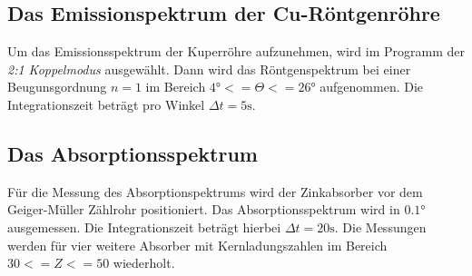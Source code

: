 \subsection{Das Emissionspektrum der Cu-Röntgenröhre}
Um das Emissionsspektrum der Kuperröhre aufzunehmen, wird im Programm der \textit{2:1 Koppelmodus}
ausgewählt. Dann wird das Röntgenspektrum bei einer Beugunsgordnung $n=1$ im Bereich
$4 \si{\degree} <= \Theta <= 26 \si{\degree}$ aufgenommen. Die Integrationszeit
beträgt pro Winkel $\Delta t = 5 \si{\second}$.

\subsection{Das Absorptionsspektrum}
Für die Messung des Absorptionspektrums wird der Zinkabsorber vor dem Geiger-Müller
Zählrohr positioniert. Das Absorptionsspektrum wird in $0.1 \si{\degree}$ ausgemessen.
Die Integrationszeit beträgt hierbei $\Delta t = 20 \si{\second}$.
Die Messungen werden für vier weitere Absorber mit Kernladungszahlen im Bereich
$30 <= Z <= 50$ wiederholt.
